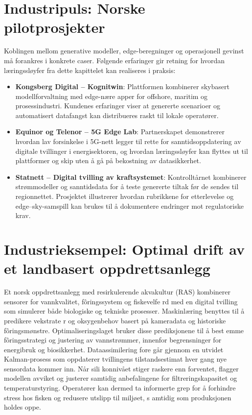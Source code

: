 \section{Industripuls: Norske pilotprosjekter}
Koblingen mellom generative modeller, edge-beregninger og operasjonell gevinst må forankres i konkrete caser. Følgende erfaringer gir retning for hvordan læringssløyfer fra dette kapittelet kan realiseres i praksis:
\begin{itemize}
    \item \textbf{Kongsberg Digital -- Kognitwin}: Plattformen kombinerer skybasert modellforvaltning med edge-nære apper for offshore, maritim og prosessindustri. Kundenes erfaringer viser at genererte scenarioer og automatisert datafangst kan distribueres raskt til lokale operatører.\citep{kongsberg2023kognitwin}
    \item \textbf{Equinor og Telenor -- 5G Edge Lab}: Partnerskapet demonstrerer hvordan lav forsinkelse i 5G-nett legger til rette for sanntidsoppdatering av digitale tvillinger i energisektoren, og hvordan læringssløyfer kan flyttes ut til plattformer og skip uten å gå på bekostning av datasikkerhet.\citep{telenor2021equinor5g}
    \item \textbf{Statnett -- Digital tvilling av kraftsystemet}: Kontrolltårnet kombinerer strømmodeller og sanntidsdata for å teste genererte tiltak før de sendes til regionnettet. Prosjektet illustrerer hvordan rubrikkene for etterlevelse og edge--sky-samspill kan brukes til å dokumentere endringer mot regulatoriske krav.\citep{statnett2023digital}
\end{itemize}

\section{Industrieksempel: Optimal drift av et landbasert oppdrettsanlegg}
Et norsk oppdrettsanlegg med resirkulerende akvakultur (RAS) kombinerer sensorer for vannkvalitet, fôringssystem og fiskevelfe
rd med en digital tvilling som simulerer både biologiske og tekniske prosesser. Maskinlæring benyttes til å predikere vekstrate
r og oksygenbehov basert på kameradata og historiske fôringsmønstre. Optimaliseringslaget bruker disse prediksjonene til å best
emme fôringsstrategi og justering av vannstrømmer, innenfor begrensninger for energibruk og biosikkerhet. Dataassimilering fore
går gjennom en utvidet Kalman-prosess som oppdaterer tvillingens tilstandsestimat hver gang nye sensordata kommer inn. Når sili
konnivået stiger raskere enn forventet, flagger modellen avviket og justerer samtidig anbefalingene for filtreringskapasitet og
temperaturstyring. Operatører kan dermed ta informerte grep for å forhindre stress hos fisken og redusere utslipp til miljøet, s
amtidig som produksjonen holdes oppe.

